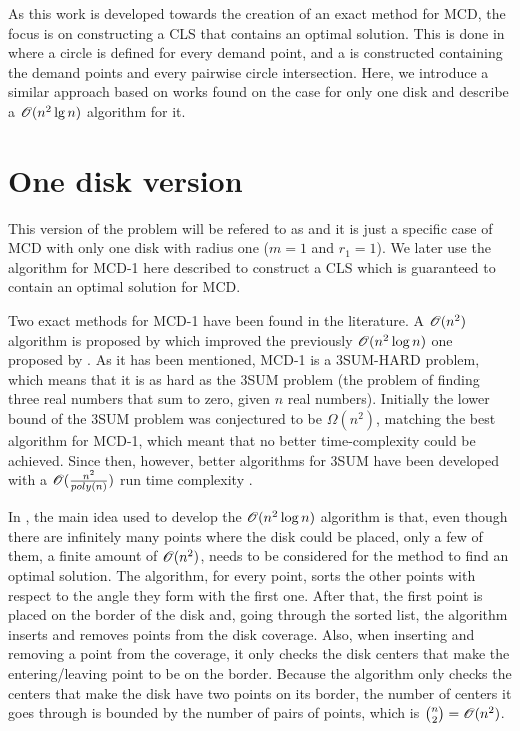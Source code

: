 As this work is developed towards the creation of an exact method for MCD, the focus is on constructing a CLS that contains an optimal solution.
This is done in  where a circle is defined for every demand point, and a  is constructed containing the demand points and every pairwise circle intersection.
Here, we introduce a similar approach based on works found on the case for only one disk and describe a $\mathscr{O}(n^2\lg{n})$ algorithm for it.


\section{One disk version}

This version of the problem will be refered to as  and it is just a specific case of MCD with only one disk with radius one ($m=1$ and $r_1=1$). We later use the algorithm for MCD-1 here described to construct a CLS which is guaranteed to contain an optimal solution for MCD.

Two exact methods for MCD-1 have been found in the literature. A $\mathscr{O}(n^2)$ algorithm is proposed by  which improved the previously $\mathscr{O}(n^2\log{n})$ one proposed by .
As it has been mentioned, MCD-1 is a 3SUM-HARD problem, which means that it is as hard as the 3SUM problem (the problem of finding three real numbers that sum to zero, given $n$ real numbers). Initially the lower bound of the 3SUM problem was conjectured to be $\Omega(n^2)$, matching the best algorithm for MCD-1, which meant that no better time-complexity could be achieved. Since then, however, better algorithms for 3SUM have been developed with a $\mathscr{O}(\frac{n^2}{poly(n)})$ run time complexity \cite{3SUM-kopelowitz:2014}.


In , the main idea used to develop the $\mathscr{O}(n^2\log{n})$ algorithm is that, even though there are infinitely many points where the disk could be placed, only a few of them, a finite amount of $\mathscr{O}(n^2)$, needs to be considered for the method to find an optimal solution.
The algorithm, for every point, sorts the other points with respect to the angle they form with the first one. After that, the first point is placed on the border of the disk and, going through the sorted list, the algorithm inserts and removes points from the disk coverage. Also, when inserting and removing a point from the coverage, it only checks the disk centers that make the entering/leaving point to be on the border. Because the algorithm only checks the centers that make the disk have two points on its border, the number of centers it goes through is bounded by the number of pairs of points, which is $\binom{n}{2} = \mathscr{O}(n^2)$.

